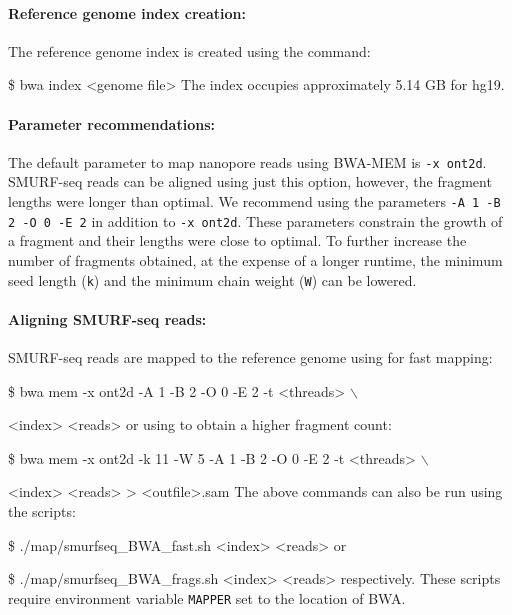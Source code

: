 \documentclass[11pt]{article}
\newenvironment{cmd}
{\list{}{
    \parsep=0em
    \itemindent=17pt
    \listparindent=50pt
    \leftmargin=0in
    \rightmargin=0in
  }\item[] \ttfamily \$}
{\endlist}
\begin{document}
\label{bwa}
\paragraph{Reference genome index creation:}
The reference genome index is created using the command:
\begin{cmd}
  bwa index <genome file>
\end{cmd}
The index occupies approximately 5.14 GB for hg19.

\paragraph{Parameter recommendations:}
The default parameter to map nanopore reads using BWA-MEM is \texttt{-x~ont2d}.
SMURF-seq reads can be aligned using just this option, however, the fragment
lengths were longer than optimal. We recommend using the parameters
\texttt{-A 1 -B 2 -O 0 -E 2} in addition to \texttt{-x~ont2d}. These
parameters constrain the growth of a fragment and their lengths were close to
optimal. To further increase the number of fragments obtained, at the
expense of a longer runtime, the minimum seed length (\texttt{k}) and the
minimum chain weight (\texttt{W}) can be lowered.


\paragraph{Aligning SMURF-seq reads:}
SMURF-seq reads are mapped to the reference genome using for fast mapping:
\begin{cmd}
  bwa mem -x ont2d -A 1 -B 2 -O 0 -E 2 -t <threads> $\backslash$ \par
  <index> <reads>
\end{cmd}
or using to obtain a higher fragment count:
\begin{cmd}
  bwa mem -x ont2d -k 11 -W 5 -A 1 -B 2 -O 0 -E 2 -t <threads> $\backslash$
  \par <index> <reads> > <outfile>.sam
\end{cmd}
The above commands can also be run using the scripts:
\begin{cmd}
  ./map/smurfseq\_BWA\_fast.sh <index> <reads>
\end{cmd}
or
\begin{cmd}
  ./map/smurfseq\_BWA\_frags.sh <index> <reads>
\end{cmd}
\noindent
respectively. These scripts require environment variable \texttt{MAPPER}
set to the location of BWA.
\end{document}
